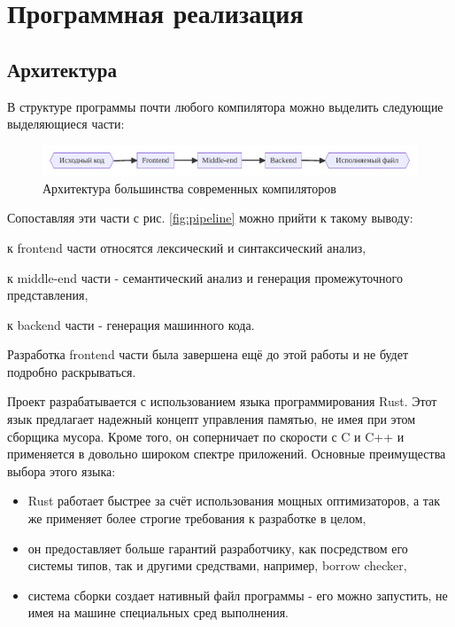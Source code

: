 \chapter{Программная реализация}
\label{ch:chap3_soft_architecture}
\section{Архитектура}
\label{sec:architecture}

В структуре программы почти любого компилятора можно выделить следующие выделяющиеся части:

\begin{figure}[H]
    \centering
    \includegraphics[width=\textwidth]{figures/arch}
    \caption{Архитектура большинства современных компиляторов}
    \label{fig:arch}
\end{figure}

Сопоставляя эти части с рис. \ref{fig:pipeline} можно прийти к такому выводу:
\begin{inparaenum}[1)]
    \item к frontend части относятся лексический и синтаксический анализ,
    \item к middle-end части - семантический анализ и генерация промежуточного представления,
    \item к backend части - генерация машинного кода.
\end{inparaenum}
Разработка frontend части была завершена ещё до этой работы и не будет подробно раскрываться.

Проект разрабатывается с использованием языка программирования Rust.
Этот язык предлагает надежный концепт управления памятью, не имея при этом сборщика мусора.
Кроме того, он соперничает по скорости с C и C++ и применяется в довольно широком спектре приложений.
Основные преимущества выбора этого языка:
\begin{itemize}
    \item Rust работает быстрее за счёт использования мощных оптимизаторов, а так же применяет более строгие требования к разработке в целом,
    \item он предоставляет больше гарантий разработчику, как посредством его системы типов, так и другими средствами, например, borrow checker,
    \item система сборки создает нативный файл программы - его можно запустить, не имея на машине специальных сред выполнения.
\end{itemize}


